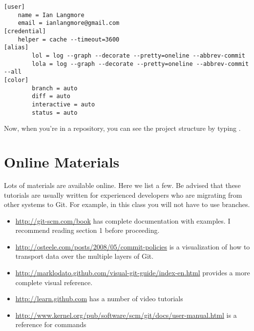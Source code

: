 \begin{verbatim}
[user]
    name = Ian Langmore
    email = ianlangmore@gmail.com
[credential]
    helper = cache --timeout=3600
[alias]
        lol = log --graph --decorate --pretty=oneline --abbrev-commit
        lola = log --graph --decorate --pretty=oneline --abbrev-commit --all
[color]
        branch = auto
        diff = auto
        interactive = auto
        status = auto
\end{verbatim}

Now, when you're in a repository, you can see the project structure by typing .

\section{Online Materials}
\label{git:online_materials}
Lots of materials are available online.  Here we list a few.  Be advised that these tutorials are usually written for experienced developers who are migrating from other systems to Git.  For example, in this class you will not have to use branches.

\begin{itemize}
  \item \url{http://git-scm.com/book} has complete documentation with examples.  I recommend reading section 1 before proceeding.
  \item \url{http://osteele.com/posts/2008/05/commit-policies} is a visualization of how to transport data over the multiple layers of Git.
  \item \url{http://marklodato.github.com/visual-git-guide/index-en.html} provides a more complete visual reference.
  \item \url{http://learn.github.com} has a number of video tutorials
  \item \url{http://www.kernel.org/pub/software/scm/git/docs/user-manual.html} is a reference for commands
\end{itemize}

